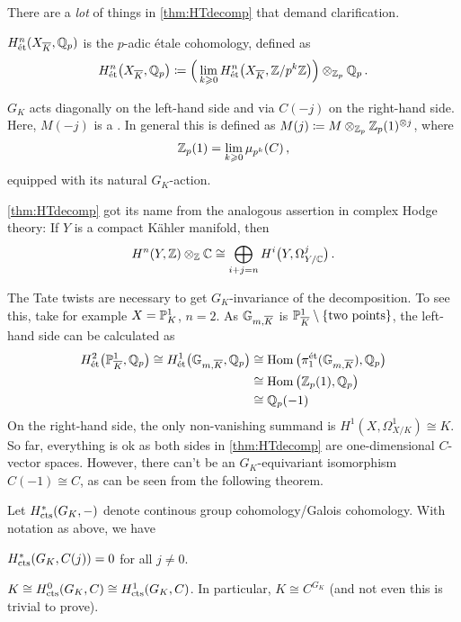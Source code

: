 \begin{rem}\label{rem:HTdecomp}
	There are a \emph{lot} of things in \cref{thm:HTdecomp} that demand clarification.
	\begin{numerate}
		\item $H_\et^n(X_{\ov{K}},\IQ_p)$ is the $p$-adic étale cohomology, defined as
		\begin{equation*}
			H_\et^n\big(X_{\ov{K}},\IQ_p\big)\coloneqq \Big(\lim_{k\geq 0} H_{\et}^n\big(X_{\ov{K}},\IZ/p^k\IZ\big)\Big)\otimes_{\IZ_p}\IQ_p\,.
		\end{equation*}
		\item $G_K$ acts diagonally on the left-hand side and via $C(-j)$ on the right-hand side. Here, $M(-j)$ is a . In general this is defined as $M(j)\coloneqq M\otimes_{\mathbb{Z}_p}\mathbb{Z}_p(1)^{\otimes j}$, where
		\begin{equation*}
			\mathbb{Z}_p(1)=\lim_{k\geqslant 0}\mu_{p^k}(C)\,,
		\end{equation*}
		equipped with its natural $G_K$-action.
		\item \cref{thm:HTdecomp} got its name from the analogous assertion in complex Hodge theory: If $Y$ is a compact Kähler manifold, then
		\begin{equation*}
			H^n(Y,\mathbb{Z})\otimes_{\mathbb{Z}}\mathbb{C}\cong\bigoplus_{i+j=n}H^i\big(Y,\Omega_{Y/\mathbb{C}}^j\big)\,.
		\end{equation*}
		\item The Tate twists are necessary to get $G_K$-invariance of the decomposition. To see this, take for example $X=\mathbb{P}_K^1$, $n=2$. As $\IG_{m,\ov{K}}$ is $\IP_{\ov{K}}^1\setminus\{\text{two points}\}$, the left-hand side can be calculated as
		\begin{align*}
			H_\et^2\big(\IP_{\ov{K}}^1,\IQ_p\big)\cong H_\et^1\big(\IG_{m,\ov{K}},\IQ_p\big)&\cong \Hom\big(\pi_1^\et(\IG_{m,\ov{K}}),\IQ_p\big)\\
			&\cong \Hom\big(\IZ_p(1),\IQ_p\big)\\
			&\cong \IQ_p(-1)
		\end{align*}
		On the right-hand side, the only non-vanishing summand is $H^1(X,\Omega_{X/K}^1)\cong K$. So far, everything is ok as both sides in \cref{thm:HTdecomp} are one-dimensional $C$-vector spaces. However, there can't be an $G_K$-equivariant isomorphism $C(-1)\cong C$, as can be seen from the following theorem. 
	\end{numerate}
\end{rem}
\begin{thm}[Tate]
	Let $H_{\mathrm{cts}}^*(G_K,-)$ denote continous group cohomology/Galois cohomology. With notation as above, we have
	\begin{numerate}
		\item $H_{\mathrm{cts}}^*(G_K,C(j))=0$ for all $j\neq 0$.
		\item $K\cong H_{\mathrm{cts}}^0(G_K,C)\cong H_{\mathrm{cts}}^1(G_K,C)$. In particular, $K\cong C^{G_K}$ (and not even this is trivial to prove).
	\end{numerate}
\end{thm}
